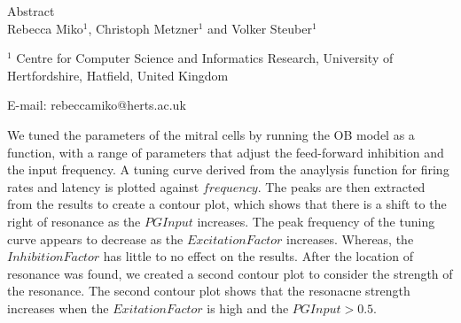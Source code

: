 \documentclass[11pt]{report}
\begin{document}
{\Huge Abstract}\\

Rebecca Miko$^1$, Christoph Metzner$^1$ and Volker Steuber$^1$

$^1$ Centre for Computer Science and Informatics Research, University of Hertfordshire, Hatfield, United Kingdom 

E-mail: rebeccamiko@herts.ac.uk


We tuned the parameters of the mitral cells by running the OB model as a function, with a range of parameters that adjust the feed-forward inhibition and the input frequency.
A tuning curve derived from the anaylysis function for firing rates and latency is plotted against $frequency$. 
The peaks are then extracted from the results to create a contour plot, which shows that there is a shift to the right of resonance as the $PGInput$ increases.
The peak frequency of the tuning curve appears to decrease as the $Excitation Factor$ increases.
Whereas, the $Inhibition Factor$ has little to no effect on the results.
After the location of resonance was found, we created a second contour plot to consider the strength of the resonance.
The second contour plot shows that the resonacne strength increases when the $Exitation Factor$ is high and the $PGInput > 0.5$.  
\end{document}
